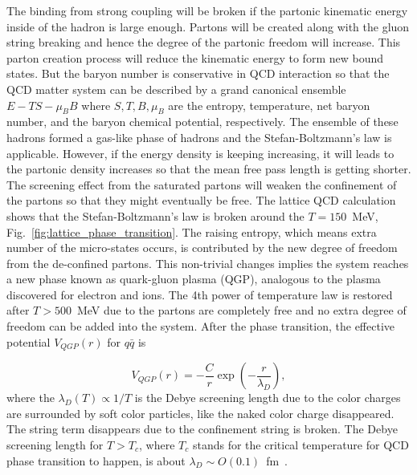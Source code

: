 The binding from strong coupling will be broken if the partonic kinematic energy inside of the hadron is large enough. Partons will be created along with the gluon string breaking and hence the degree of the partonic freedom will increase. This parton creation process will reduce the kinematic energy to form new bound states. But the baryon number is conservative in QCD interaction so that the QCD matter system can be described by a grand canonical ensemble $E-TS-\mu_BB$ where $S, T, B, \mu_B$ are the entropy, temperature, net baryon number, and the baryon chemical potential, respectively. The ensemble of these hadrons formed a gas-like phase of hadrons and the Stefan-Boltzmann's law is applicable. However, if the energy density is keeping increasing, it will leads to the partonic density increases so that the mean free pass length is getting shorter. The screening effect from the saturated partons will weaken the confinement of the partons so that they might eventually be free. The lattice QCD calculation shows that the Stefan-Boltzmann's law is broken around the $T=150$~MeV, Fig.~\ref{fig:lattice_phase_transition}. The raising entropy, which means extra number of the micro-states occurs, is contributed by the new degree of freedom from the de-confined partons. This non-trivial changes implies the system reaches a new phase known as quark-gluon plasma (QGP), analogous to the plasma discovered for electron and ions. The 4th power of temperature law is restored after $T>500$~MeV due to the partons are completely free and no extra degree of freedom can be added into the system. After the phase transition, the effective potential $V_{QGP}(r)$ for $q\bar q$ is

\begin{equation}
  V_{QGP}(r)=-\frac{C}{r}\exp\left(-\frac{r}{\lambda_D}\right),
\end{equation}
where the $\lambda_D(T)\propto 1/T$ is the Debye screening length due to the color charges are surrounded by soft color particles, like the naked color charge disappeared. The string term disappears due to the confinement string is broken. The Debye screening length for $T>T_c$, where $T_c$ stands for the critical temperature for QCD phase transition to happen, is about $\lambda_D\sim O(0.1)$~fm~\cite{Kajantie:1997pd}.

